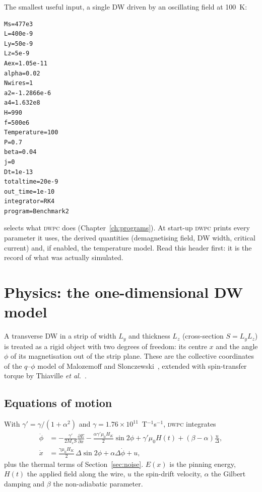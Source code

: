 \documentclass[11pt,a4paper]{report}
\newcommand{\key}[1]{\texttt{\detokenize{#1}}}
\newcommand{\dwpc}{\textsc{dwpc}}
\begin{document}
The smallest useful input, a single DW driven by an oscillating field at 100~K:
\begin{lstlisting}
Ms=477e3
L=400e-9
Ly=50e-9
Lz=5e-9
Aex=1.05e-11
alpha=0.02
Nwires=1
a2=-1.2866e-6
a4=1.632e8
H=990
f=500e6
Temperature=100
P=0.7
beta=0.04
j=0
Dt=1e-13
totaltime=20e-9
out_time=1e-10
integrator=RK4
program=Benchmark2
\end{lstlisting}
\key{program} selects what \dwpc{} does (Chapter~\ref{ch:programs}). At start-up \dwpc{} prints every parameter it uses, the derived quantities (demagnetising field, DW width, critical current) and, if enabled, the temperature model. Read this header first: it is the record of what was actually simulated.

\chapter{Physics: the one-dimensional DW model}\label{ch:model}

A transverse DW in a strip of width $L_y$ and thickness $L_z$ (cross-section $S=L_yL_z$) is treated as a rigid object with two degrees of freedom: its centre $x$ and the angle $\phi$ of its magnetisation out of the strip plane. These are the collective coordinates of the $q$--$\phi$ model of Malozemoff and Slonczewski~\cite{malozemoff}, extended with spin-transfer torque by Thiaville \emph{et al.}~\cite{thiaville}.

\section{Equations of motion}
With $\gamma'=\gamma/(1+\alpha^2)$ and $\gamma=1.76\times10^{11}$~T$^{-1}$s$^{-1}$, \dwpc{} integrates
\begin{align}
\dot\phi &= -\frac{\gamma'}{2M_sS}\frac{\partial E}{\partial x} - \frac{\alpha\gamma'\mu_0H_K}{2}\sin2\phi + \gamma'\mu_0H(t) + (\beta-\alpha)\frac{u}{\Delta}, \label{eq:phi}\\
\dot x &= \frac{\gamma\mu_0H_K}{2}\,\Delta\sin2\phi + \alpha\Delta\dot\phi + u, \label{eq:x}
\end{align}
plus the thermal terms of Section~\ref{sec:noise}. $E(x)$ is the pinning energy, $H(t)$ the applied field along the wire, $u$ the spin-drift velocity, $\alpha$ the Gilbert damping and $\beta$ the non-adiabatic parameter.
\end{document}
